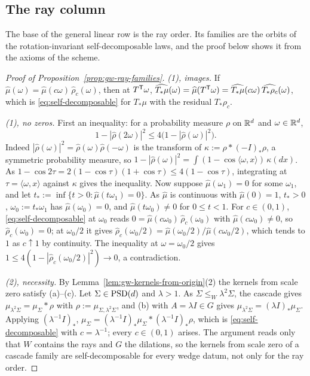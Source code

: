 \subsection{The ray column}\label{app:wedge-axis-rays}

The base of the general linear row is the ray order. Its families are the orbits of the
rotation-invariant self-decomposable laws, and the proof below shows it from the axioms of the scheme.

\begin{proof}[Proof of Proposition~\ref{prop:gw-ray-families}]
\emph{(1), images.} If $\widehat\mu(\omega) = \widehat\mu(c\omega)\,\widehat\rho_c(\omega)$, then at $T^{\mathsf{T}}\omega$,
$\widehat{T_*\mu}(\omega) = \widehat\mu(T^{\mathsf{T}}\omega) = \widehat{T_*\mu}(c\omega)\,\widehat{T_*\rho_c}(\omega)$, which is
\ref{eq:self-decomposable} for $T_*\mu$ with the residual $T_*\rho_c$.

\emph{(1), no zeros.} First an inequality: for a probability measure $\rho$ on $\mathbb{R}^d$ and
$\omega \in \mathbb{R}^d$,
\[
  1 - |\widehat\rho(2\omega)|^2 \le 4\bigl(1 - |\widehat\rho(\omega)|^2\bigr) .
\]
Indeed $|\widehat\rho(\omega)|^2 = \widehat\rho(\omega)\widehat\rho(-\omega)$ is the transform of
$\kappa := \rho * (-I)_*\rho$, a symmetric probability measure, so
$1 - |\widehat\rho(\omega)|^2 = \int(1 - \cos\langle\omega,x\rangle)\,\kappa(dx)$. As
$1 - \cos 2\tau = 2(1 - \cos\tau)(1 + \cos\tau) \le 4(1 - \cos\tau)$, integrating at
$\tau = \langle\omega,x\rangle$ against $\kappa$ gives the inequality. Now suppose
$\widehat\mu(\omega_1) = 0$ for some $\omega_1$, and let $t_* := \inf\{t > 0 : \widehat\mu(t\omega_1) = 0\}$. As $\widehat\mu$
is continuous with $\widehat\mu(0) = 1$, $t_* > 0$, $\omega_0 := t_*\omega_1$ has $\widehat\mu(\omega_0) = 0$, and
$\widehat\mu(t\omega_0) \ne 0$ for $0 \le t < 1$. For $c \in (0,1)$, \ref{eq:self-decomposable} at $\omega_0$ reads
$0 = \widehat\mu(c\omega_0)\,\widehat\rho_c(\omega_0)$ with $\widehat\mu(c\omega_0) \ne 0$, so $\widehat\rho_c(\omega_0) = 0$; at
$\omega_0/2$ it gives $\widehat\rho_c(\omega_0/2) = \widehat\mu(\omega_0/2)/\widehat\mu(c\omega_0/2)$, which tends to $1$ as
$c \uparrow 1$ by continuity. The inequality at $\omega = \omega_0/2$ gives
$1 \le 4(1 - |\widehat\rho_c(\omega_0/2)|^2) \to 0$, a contradiction.

\emph{(2), necessity.} By Lemma~\ref{lem:gw-kernels-from-origin}(2) the kernels from scale zero satisfy
(a)--(c). Let $\Sigma \in \mathrm{PSD}(d)$ and $\lambda > 1$. As $\Sigma \le_W \lambda^2\Sigma$, the cascade gives
$\mu_{\lambda^2\Sigma} = \mu_\Sigma * \rho$ with $\rho := \mu_{\Sigma,\lambda^2\Sigma}$, and (b) with
$A = \lambda I \in G$ gives $\mu_{\lambda^2\Sigma} = (\lambda I)_*\mu_\Sigma$. Applying $(\lambda^{-1}I)_*$,
$\mu_\Sigma = (\lambda^{-1}I)_*\mu_\Sigma * (\lambda^{-1}I)_*\rho$, which is \ref{eq:self-decomposable} with
$c = \lambda^{-1}$; every $c \in (0,1)$ arises. The argument reads only that $W$ contains the rays and
$G$ the dilations, so the kernels from scale zero of a cascade family are self-decomposable for every
wedge datum, not only for the ray order.


\end{proof}
